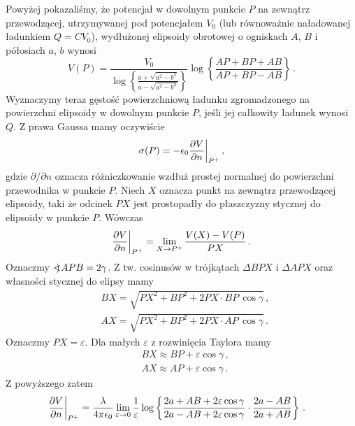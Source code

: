 \documentclass[../main.tex]{subfiles}
\begin{document}
\begin{enumerate}
Powyżej pokazaliśmy, że potencjał w dowolnym punkcie \(P\) na zewnątrz przewodzącej, utrzymywanej pod potencjałem \(V_0\) (lub równoważnie naładowanej ładunkiem \(Q=CV_0\)), wydłużonej elipsoidy obrotowej o ogniskach \(A\), \(B\) i półosiach \(a\), \(b\) wynosi
\begin{equation*}
    V(P)=\frac{V_0}{\log\left\{\frac{a+\sqrt{a^2-b^2}}{a-\sqrt{a^2-b^2}}\right\}}\log\left\{\frac{AP+BP+AB}{AP+BP-AB}\right\}\,.
\end{equation*}
 Wyznaczymy teraz gęstość powierzchniową ładunku zgromadzonego na powierzchni elipsoidy w dowolnym punkcie \(P\), jeśli jej całkowity ładunek wynosi \(Q\). Z prawa Gaussa mamy oczywiście
\begin{equation*}
    \sigma(P)=-\epsilon_0\pdv{V}{n}\bigg|_{P^+}\,,
\end{equation*}
gdzie \(\partial/\partial n\) oznacza różniczkowanie wzdłuż prostej normalnej do powierzchni przewodnika w punkcie \(P\). Niech \(X\) oznacza punkt na zewnątrz przewodzącej elipsoidy, taki że odcinek \(PX\) jest prostopadły do płaszczyzny stycznej do elipsoidy w punkcie  \(P\). Wówczas
\begin{equation*}
   \pdv{V}{n}\bigg|_{P^+}=\lim_{X\to {P^+}}\frac{V(X)-V(P)}{PX}\,.
\end{equation*}
Oznaczmy \(\mathord{<\mspace{-9mu}\mathrel{)}\mspace{2mu}} APB=2\gamma\). Z tw. cosinusów w trójkątach \(\Delta BPX\) i \(\Delta APX\) oraz własności stycznej do elipsy mamy
\begin{equation*}
    \begin{split}
        &BX=\sqrt{PX^2+BP^2+2PX\cdot BP\,\cos\gamma}\,,\\
        &AX=\sqrt{PX^2+BP^2+2PX\cdot AP\,\cos\gamma}\,.
    \end{split}
\end{equation*}
Oznaczmy \(PX=\varepsilon\). Dla małych \(\varepsilon\) z rozwinięcia Taylora mamy
\begin{equation*}
\begin{split}
     &BX\approx BP+\varepsilon \cos\gamma\,,\\
     &AX\approx AP+\varepsilon \cos\gamma\,.
\end{split}
\end{equation*}
Z powyższego zatem
\begin{equation*}
\begin{split}
    &\pdv{V}{n}\bigg|_{P^+}=\frac{\lambda}{4\pi\epsilon_0}\lim_{\varepsilon\to 0}\frac{1}{\varepsilon}\log\left\{\frac{2a+AB+2\varepsilon\cos\gamma}{2a-AB+2\varepsilon\cos\gamma}\cdot\frac{2a-AB}{2a+AB}\right\}\,.

\end{split}
\end{equation*}
\end{enumerate}
\end{document}

